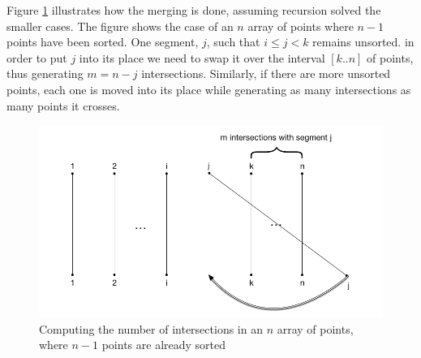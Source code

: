 Figure \ref{fig:pointInd} illustrates how the merging is done, assuming recursion solved the smaller cases. 
The figure shows the case of an $n$ array of points where $n-1$ points have been sorted.
One segment, $j$, such that $i \leq j < k$ remains unsorted.
in order to put $j$ into its place we need to swap it over the interval $[k .. n]$ of points, thus generating $m = n - j$ intersections.
Similarly, if there are more unsorted points, each one is moved into its place while generating as many intersections as many points it crosses.

\begin{figure}[H]
    \centering
    \includegraphics[scale=0.4]{1b-intersections-ind}
    \caption{Computing the number of intersections in an $n$ array of points, where $n-1$ points are already sorted}
    \label{fig:pointInd}
\end{figure}

